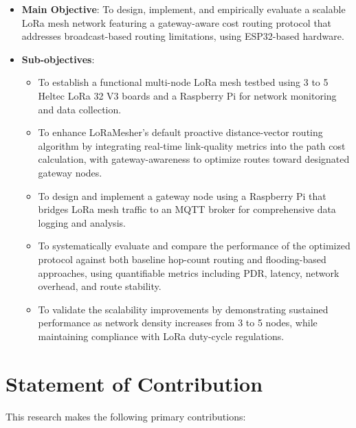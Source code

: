 \begin{itemize}
\item \textbf{Main Objective}: To design, implement, and empirically evaluate a scalable LoRa mesh network featuring a gateway-aware cost routing protocol that addresses broadcast-based routing limitations, using ESP32-based hardware.

\item \textbf{Sub-objectives}:
\begin{itemize}
\item To establish a functional multi-node LoRa mesh testbed using 3 to 5 Heltec LoRa 32 V3 boards and a Raspberry Pi for network monitoring and data collection.

\item To enhance LoRaMesher's default proactive distance-vector routing algorithm by integrating real-time link-quality metrics into the path cost calculation, with gateway-awareness to optimize routes toward designated gateway nodes.

\item To design and implement a gateway node using a Raspberry Pi that bridges LoRa mesh traffic to an MQTT broker for comprehensive data logging and analysis.

\item To systematically evaluate and compare the performance of the optimized protocol against both baseline hop-count routing and flooding-based approaches, using quantifiable metrics including PDR, latency, network overhead, and route stability.

\item To validate the scalability improvements by demonstrating sustained performance as network density increases from 3 to 5 nodes, while maintaining compliance with LoRa duty-cycle regulations.
\end{itemize}
\end{itemize}

\section{Statement of Contribution}
\label{sec:contribution}

This research makes the following primary contributions:

